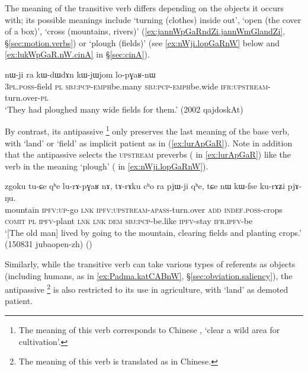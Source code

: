 The meaning of the transitive verb  differs depending on the  objects it occurs with; its possible meanings include `turning (clothes) inside out', `open (the cover of a box)', `cross (mountains, rivers)' (\ref{ex:jannWpGaRndZi.jannWmGlandZi}, §\ref{sec:motion.verbs}) or `plough (fields)' (see \ref{ex:nWji.lopGaRnW} below and \ref{ex:lukWpGaR.nW.cinA} in §\ref{sec:cinA}). 

\begin{exe}
\ex \label{ex:nWji.lopGaRnW}
\gll nɯ-ji ra kɯ-dɯ\redp{}dɤn kɯ-jɯ\redp{}jom lo-pɣaʁ-nɯ \\
\textsc{3pl}.\textsc{poss}-field \textsc{pl} \textsc{sbj}:\textsc{pcp}-\textsc{emph}\redp{}be.many \textsc{sbj}:\textsc{pcp}-\textsc{emph}\redp{}be.wide \textsc{ifr}:\textsc{upstream}-turn.over-\textsc{pl} \\
\glt `They had ploughed many wide fields for them.' (2002 qajdoskAt)
\end{exe}

By contrast, its antipassive \footnote{The meaning of this verb corresponds to Chinese , `clear a wild area for cultivation'.}  only preserves the last meaning of the base verb, with `land' or `field' as implicit patient as in (\ref{ex:lurApGaR}). Note in addition that the antipassive selects the \textsc{upstream} preverbs ( in \ref{ex:lurApGaR}) like the verb  in the meaning `plough' ( in \ref{ex:nWji.lopGaRnW}).

\begin{exe}
\ex \label{ex:lurApGaR}
\gll zgoku tu-ɕe qʰe lu-rɤ-pɣaʁ nɤ, tɤ-rɤku cʰo ra pjɯ-ji qʰe,  tɕe nɯ kɯ-fse ku-rɤʑi pjɤ-ŋu. \\
mountain \textsc{ipfv}:\textsc{up}-go \textsc{lnk} \textsc{ipfv}:\textsc{upstream}-\textsc{apass}-turn.over \textsc{add} \textsc{indef}.\textsc{poss}-crops \textsc{comit} \textsc{pl} \textsc{ipfv}-plant \textsc{lnk} \textsc{lnk} \textsc{dem} \textsc{sbj}:\textsc{pcp}-be.like \textsc{ipfv}-stay \textsc{ifr}.\textsc{ipfv}-be \\
\glt `[The old man] lived by going to the mountain, clearing fields and  planting crops.' (150831 jubaopen-zh)
()
\end{exe}

Similarly, while the transitive verb  can take various types of referents as objects (including humans, as in \ref{ex:Padma.katCABnW}, §\ref{sec:obviation.saliency}), the antipassive \footnote{The meaning of this verb is translated as  in Chinese. } is also restricted to its use in agriculture, with `land' as demoted patient.

